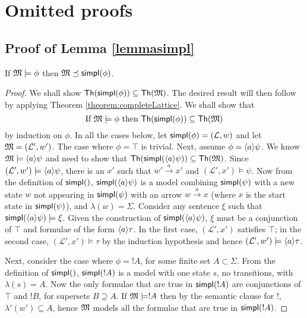 \section{Omitted proofs}\label{app:completeness:proofs}\label{inc-appendix}

\subsection{Proof of Lemma \ref{lemmasimpl}}\label{app:decision:proofs}

If $\frak{M} \models \phi$ then $\frak{M} \preceq \mathsf{simpl}(\phi)$.

\begin{proof}
We shall show $\mathsf{Th}(\mathsf{simpl}(\phi)) \subseteq \mathsf{Th}(\frak{M})$.
The desired result will then follow by applying Theorem \ref{theorem:completeLattice}.
We shall show that
\[
\text{If } \frak{M} \models \phi \text{ then } \mathsf{Th}(\mathsf{simpl}(\phi)) \subseteq \mathsf{Th}(\frak{M})
\]
by induction on $\phi$.
In all the cases below, let $\mathsf{simpl}(\phi) = (\mathcal{L}, w)$ and let $\frak{M} = (\mathcal{L}', w')$.
The case where $\phi = \top$ is trivial.
Next, assume $\phi = \langle a \rangle \psi$.
We know $\frak{M} \models \langle a \rangle \psi$ and need to show that $\mathsf{Th}(\mathsf{simpl}(\langle a \rangle \psi)) \subseteq \mathsf{Th}(\frak{M})$.
Since $(\mathcal{L}', w') \models \langle a \rangle \psi$, there is an $x'$ such that $w' \xrightarrow{a} x'$ and $(\mathcal{L}', x') \models \psi$.
Now from the definition of $\mathsf{simpl}()$, $\mathsf{simpl}(\langle a \rangle \psi)$ is a model combining $\mathsf{simpl}(\psi)$ with a new state $w$ not appearing in $\mathsf{simpl}(\psi)$ with an arrow $w \xrightarrow{a} x$ (where $x$ is the start state in $\mathsf{simpl}(\psi)$), and $\lambda(w) = \Sigma$. 
Consider any sentence $\xi$ such that $\mathsf{simpl}(\langle a \rangle \psi) \models \xi$. Given the construction of $\mathsf{simpl}(\langle a \rangle \psi)$, $\xi$ must be a conjunction of $\top$ and formulae of the form $\langle a \rangle \tau$. In the first case, $(\mathcal{L}', x')$ satisfies $\top$; in the second case, $(\mathcal{L}', x') \models \tau$ by the induction hypothesis and hence $(\mathcal{L}', w') \models \langle a \rangle \tau$.

Next, consider the case where $\phi = !A$, for some finite set $A \subset \Sigma$.
From the definition of $\mathsf{simpl}()$, $\mathsf{simpl}(!A)$ is a model with one state $s$, no transitions, with $\lambda(s) = A$.
Now the only formulae that are true in $\mathsf{simpl}(!A)$ are conjunctions of $\top$ and $!B$, for supersets $B \supseteq A$.
If $\frak{M} \models !A$ then by the semantic clause for $!$, $\lambda'(w') \subseteq A$, hence $\frak{M}$ models all the formulae that are true in $\mathsf{simpl}(!A)$.


\end{proof}
